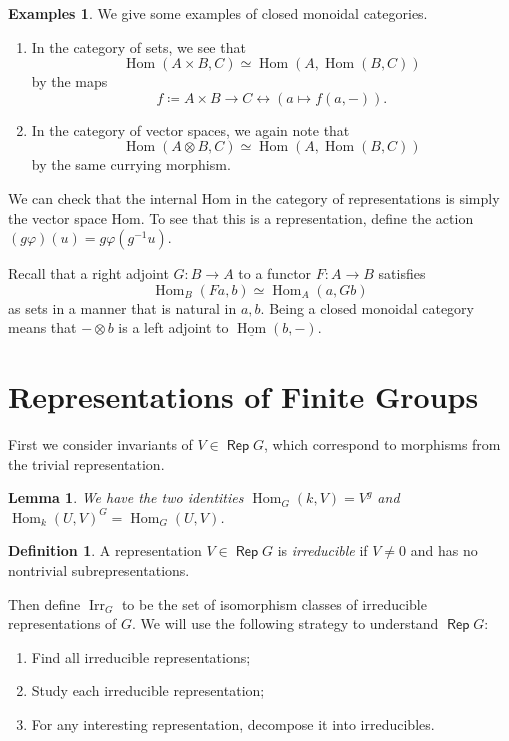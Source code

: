 \documentclass[leqno, openany]{memoir}
\newtheorem{lem}[thm]{Lemma}
\theoremstyle{definition}
\newtheorem{defn}[thm]{Definition}
\newtheorem{exms}[thm]{Examples}
\theoremstyle{remark}
\theoremstyle{plain}
\theoremstyle{definition}
\theoremstyle{remark}
\DeclareMathOperator{\Irr}{\mathrm{Irr}}
\DeclareMathOperator{\Rep}{\mathsf{Rep}}
\DeclareMathOperator{\Hom}{Hom}
\begin{document}
\begin{exms} We give some examples of closed monoidal categories.
    \begin{enumerate} \item In the category of sets, we see that \[ \Hom(A
        \times B, C) \simeq \Hom(A, \Hom(B,C)) \] by the maps \[ f \coloneqq A
    \times B \to C \leftrightarrow (a \mapsto f(a,-)). \] \item In the category
of vector spaces, we again note that \[ \Hom(A \otimes B, C) \simeq \Hom(A,
\Hom(B,C)) \] by the same currying morphism.  \end{enumerate} \end{exms}

We can check that the internal Hom in the category of representations is simply
the vector space Hom. To see that this is a representation, define the action
$(g \varphi)(u) = g \varphi(g^{-1}u)$.

Recall that a right adjoint $G: B \to A$ to a functor $F:A \to B$ satisfies \[
\Hom_B(Fa, b) \simeq \Hom_A(a,Gb) \] as sets in a manner that is natural in
$a,b$. Being a closed monoidal category means that $- \otimes b$ is a left
adjoint to $\underline{\Hom}(b,-)$.

\section{Representations of Finite Groups}%
\label{sec:representations_of_finite_groups}

First we consider invariants of $V \in \Rep G$, which correspond to morphisms
from the trivial representation.

\begin{lem} We have the two identities $\Hom_G(k,V) = V^g$ and $\Hom_k(U,V)^G =
\Hom_G(U,V)$.  \end{lem}

\begin{defn} A representation $V \in \Rep G$ is \textit{irreducible} if $V \neq
0$ and has no nontrivial subrepresentations.  \end{defn}

Then define $\Irr_G$ to be the set of isomorphism classes of irreducible
representations of $G$. We will use the following strategy to understand $\Rep
G$: \begin{enumerate} \item Find all irreducible representations; \item Study
    each irreducible representation; \item For any interesting representation,
    decompose it into irreducibles.  \end{enumerate}
\end{document}
